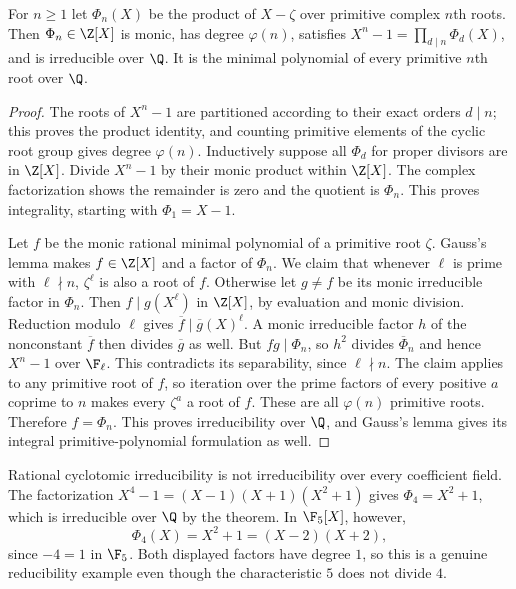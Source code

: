\begin{theorem}
For $n\geq1$ let $\Phi_n(X)$ be the product of $X-\zeta$ over primitive complex $n$th roots. Then $\Phi_n\in\Z[X]$ is monic, has degree $\varphi(n)$, satisfies $X^n-1=\prod_{d\mid n}\Phi_d(X)$, and is irreducible over $\Q$. It is the minimal polynomial of every primitive $n$th root over $\Q$.
\end{theorem}
\begin{proof}
The roots of $X^n-1$ are partitioned according to their exact orders $d\mid n$; this proves the product identity, and counting primitive elements of the cyclic root group gives degree $\varphi(n)$. Inductively suppose all $\Phi_d$ for proper divisors are in $\Z[X]$. Divide $X^n-1$ by their monic product within $\Z[X]$. The complex factorization shows the remainder is zero and the quotient is $\Phi_n$. This proves integrality, starting with $\Phi_1=X-1$.

Let $f$ be the monic rational minimal polynomial of a primitive root $\zeta$. Gauss's lemma makes $f\in\Z[X]$ and a factor of $\Phi_n$. We claim that whenever $\ell$ is prime with $\ell\nmid n$, $\zeta^\ell$ is also a root of $f$. Otherwise let $g\ne f$ be its monic irreducible factor in $\Phi_n$. Then $f\mid g(X^\ell)$ in $\Z[X]$, by evaluation and monic division. Reduction modulo $\ell$ gives $\overline f\mid \overline g(X)^\ell$. A monic irreducible factor $h$ of the nonconstant $\overline f$ then divides $\overline g$ as well. But $fg\mid\Phi_n$, so $h^2$ divides $\overline\Phi_n$ and hence $X^n-1$ over $\F_\ell$. This contradicts its separability, since $\ell\nmid n$. The claim applies to any primitive root of $f$, so iteration over the prime factors of every positive $a$ coprime to $n$ makes every $\zeta^a$ a root of $f$. These are all $\varphi(n)$ primitive roots. Therefore $f=\Phi_n$. This proves irreducibility over $\Q$, and Gauss's lemma gives its integral primitive-polynomial formulation as well.
\end{proof}

\begin{remark}
Rational cyclotomic irreducibility is not irreducibility over every coefficient field. The factorization $X^4-1=(X-1)(X+1)(X^2+1)$ gives $\Phi_4=X^2+1$, which is irreducible over $\Q$ by the theorem. In $\F_5[X]$, however,
\[\Phi_4(X)=X^2+1=(X-2)(X+2),\]
since $-4=1$ in $\F_5$. Both displayed factors have degree $1$, so this is a genuine reducibility example even though the characteristic $5$ does not divide $4$.
\end{remark}

